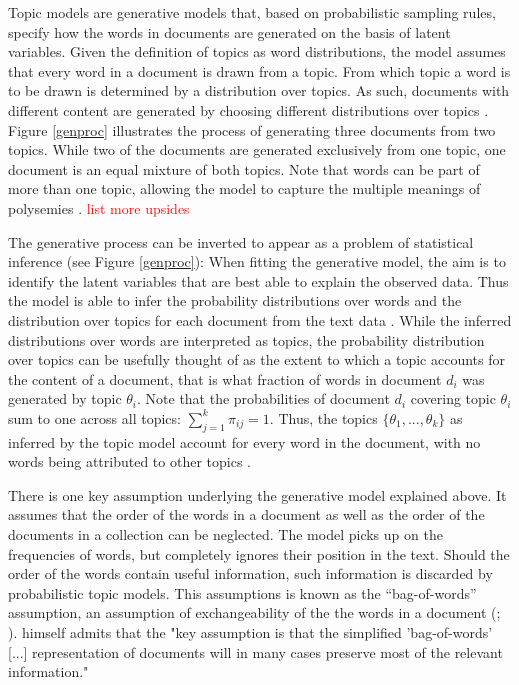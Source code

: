 \documentclass[11pt,a4paper,english,oneside]{book}
\numberwithin{equation}{chapter}
\begin{document}
Topic models are generative models that, based on probabilistic sampling rules, specify how the words in documents are generated on the basis of latent variables. Given the definition of topics as word distributions, the model assumes that every word in a document is drawn from a topic. From which topic a word is to be drawn is determined by a distribution over topics. As such, documents with different content are generated by choosing different distributions over topics \cite[~p. 2--3]{Steyvers(2007)}. Figure \ref{genproc} illustrates the process of generating three documents from two topics. While two of the documents are generated exclusively from one topic, one document is an equal mixture of both topics. Note that words can be part of more than one topic, allowing the model to capture the multiple meanings of polysemies \cite[~p. 2--3]{Steyvers(2007)}.  \textcolor{red}{list more upsides}

The generative process can be inverted to appear as a problem of statistical inference (see Figure \ref{genproc}): When fitting the generative model, the aim is to identify the latent variables that are best able to explain the observed data. Thus the model is able to infer the probability distributions over words and the distribution over topics for each document from the text data \cite[~p. 3]{Steyvers(2007)}. While the inferred distributions over words are interpreted as topics, the probability distribution over topics can be usefully thought of as the extent to which a topic accounts for the content of a document, that is what fraction of words in document $d_i$ was generated by topic $\theta_i$. Note that the probabilities of document $d_i$ covering topic $\theta_{i}$ sum to one across all topics: $\sum_{j=1}^{k} \pi_{ij} = 1.$ Thus, the topics $\{\theta_1, ..., \theta_k\}$ as inferred by the topic model account for every word in the document, with no words being attributed to other topics \cite[pp.~338]{Zhai.2016}. 

There is one key assumption underlying the generative model explained above. It assumes that the order of the words in a document as well as the order of the documents in a collection can be neglected. The model picks up on the frequencies of words, but completely ignores their position in the text. Should the order of the words contain useful information, such information is discarded by probabilistic topic models. This assumptions is known as the “bag-of-words” assumption, an assumption of exchangeability of the the words in a document (\citealt[p.~994]{Blei.2003}; \citealt[~p. 3]{Steyvers(2007)}). \citet[~p. 290]{Hofmann.1999} himself admits that the "key assumption is that the simplified 'bag-of-words' [...] representation of documents will in many cases preserve most of the relevant information." 
\end{document}
